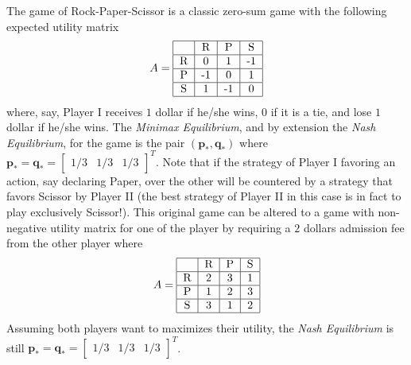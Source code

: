 \documentclass[11pt,reqno, a4]{amsart}
\begin{document}
\begin{example} The game of Rock-Paper-Scissor is a classic zero-sum game with the following expected utility matrix
 $$A = \begin{tabular}{|c|c|c|c|}
    \hline  & R & P & S \\
    \hline R  & 0 & 1 & -1 \\
    \hline P & -1 & 0 & 1 \\
    \hline S & 1 & -1 & 0 \\
    \hline
    \end{tabular}$$
    where, say, Player I receives $1$ dollar if he/she wins, $0$ if it is a tie, and lose $1$ dollar if he/she wins. The \textit{Minimax Equilibrium}, and by extension the \textit{Nash Equilibrium}, for the game is the pair $(\bm{p}_*, \bm{q}_*)$ where $\bm{p}_* = \bm{q}_* = \begin{bmatrix}
        1/3 & 1/3 & 1/3
    \end{bmatrix}^T$. Note that if the strategy of Player I favoring an action, say declaring Paper, over the other will be countered by a strategy that favors Scissor by Player II (the best strategy of Player II in this case is in fact to play exclusively Scissor!). This original game can be altered to a game with non-negative utility matrix for one of the player by requiring a $2$ dollars admission fee from the other player where 
     $$A = \begin{tabular}{|c|c|c|c|}
    \hline  & R & P & S \\
    \hline R  & 2 & 3 & 1 \\
    \hline P & 1 & 2 & 3 \\
    \hline S & 3 & 1 & 2 \\
    \hline
    \end{tabular}$$
    Assuming both players want to maximizes their utility, the \textit{Nash Equilibrium} is still $\bm{p}_* = \bm{q}_* = \begin{bmatrix}
        1/3 & 1/3 & 1/3
    \end{bmatrix}^T$.
\end{example}
\end{document}
